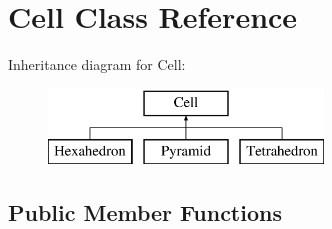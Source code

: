 \hypertarget{class_cell}{}\section{Cell Class Reference}
\label{class_cell}
Inheritance diagram for Cell\+:\begin{figure}[H]
\begin{center}
\leavevmode
\includegraphics[height=2.000000cm]{class_cell}
\end{center}
\end{figure}
\subsection*{Public Member Functions}
